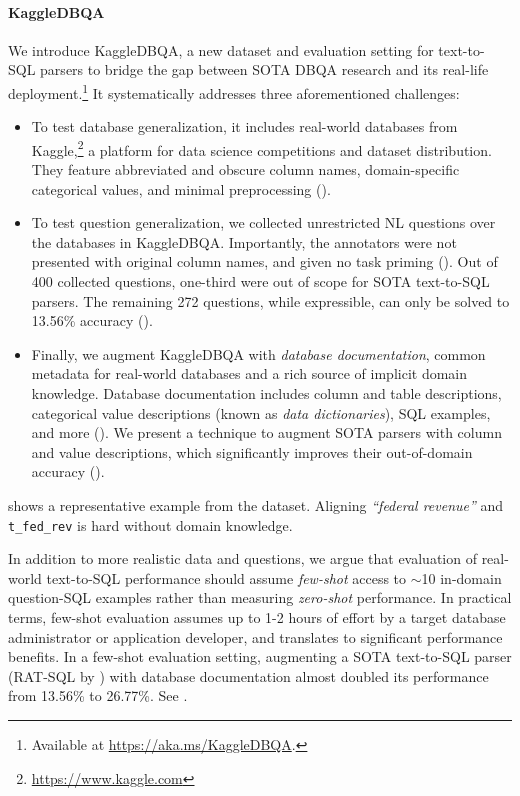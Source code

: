\documentclass[11pt,a4paper]{article}
\newcommand{\systemname}{\mbox{KaggleDBQA}\xspace}
\newcommand{\sql}[1]{\lstinline[language=SQL, basicstyle=\footnotesize\ttfamily]{#1}}
\begin{document}
\paragraph{\systemname}
We introduce \systemname, a new dataset and evaluation setting for text-to-SQL parsers to bridge the gap between SOTA
DBQA research and its real-life deployment.\footnote{Available at \url{https://aka.ms/KaggleDBQA}.}
It systematically addresses three aforementioned challenges:
\begin{itemize}[left=0pt]
    \item To test database generalization, it includes real-world databases from
        Kaggle,\footnote{\url{https://www.kaggle.com}} a platform for data science competitions and dataset
        distribution.
        They feature abbreviated and obscure column names, domain-specific categorical values, and minimal
        preprocessing ().
    \item To test question generalization, we collected unrestricted NL questions over the databases in \systemname.
        Importantly, the annotators were not presented with original column names, and given no task priming
        ().
        Out of 400 collected questions, one-third were out of scope for SOTA text-to-SQL parsers.
        The remaining 272 questions, while expressible, can only be solved to 13.56\% accuracy ().
    \item Finally, we augment \systemname with \emph{database documentation}, common metadata for real-world 
        databases and a rich source of implicit domain knowledge.
        Database documentation includes column and table descriptions, categorical value descriptions (known as
        \emph{data dictionaries}), SQL examples, and more ().
        We present a technique to augment SOTA parsers with column and value descriptions, which significantly improves their
        out-of-domain accuracy ().
\end{itemize}
 shows a representative example from the dataset.
Aligning \emph{``federal revenue''} and \sql{t_fed_rev} is hard without domain knowledge.

In addition to more realistic data and questions, we argue that evaluation of real-world text-to-SQL performance should
assume \emph{few-shot} access to $\sim$10 in-domain question-SQL examples rather than measuring \emph{zero-shot} performance.
In practical terms, few-shot evaluation assumes up to 1-2 hours of effort by a target database administrator or
application developer, and translates to significant performance benefits.
In a few-shot evaluation setting, augmenting a SOTA text-to-SQL parser (RAT-SQL by \citet{wang-etal-2020-rat}) with
database documentation almost doubled its performance from 13.56\% to 26.77\%.
See .
\end{document}
